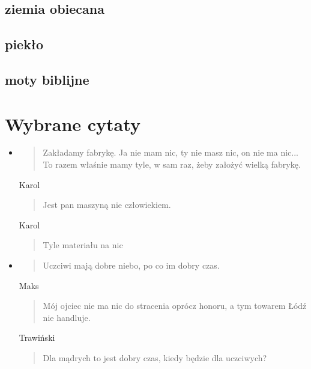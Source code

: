 \documentclass[a4paper]{article}
\begin{document}
\subsection{ziemia obiecana}
\subsection{piekło}
\subsection{moty biblijne}
\pagebreak
\section{Wybrane cytaty}
\begin{itemize}
    \item \begin{quote}
        Zakładamy fabrykę. Ja nie mam nic, ty nie masz nic, on nie ma nic... To razem właśnie mamy tyle, w sam raz, żeby założyć wielką fabrykę.
    \end{quote}
    \item[Karol] \begin{quote}
        Jest pan maszyną nie człowiekiem.    
    \end{quote}
    \item[Karol] \begin{quote}
        Tyle materiału na nic
    \end{quote}
    \item \begin{quote}
        Uczciwi mają dobre niebo, po co im dobry czas.
    \end{quote}
    \item[Maks] \begin{quote}
        Mój ojciec nie ma nic do stracenia oprócz honoru, a tym towarem Łódź nie handluje.
    \end{quote}
    \item[Trawiński] \begin{quote}
        Dla mądrych to jest dobry czas, kiedy będzie dla uczciwych?
    \end{quote}
\end{itemize}
\end{document}
